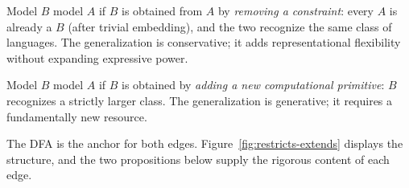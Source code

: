 \begin{defn}[Restricts]
\label{def:restricts}
Model $B$  model $A$ if $B$ is obtained from $A$ by \emph{removing a constraint}: every $A$ is already a $B$ (after trivial embedding), and the two recognize the same class of languages. The generalization is conservative; it adds representational flexibility without expanding expressive power.
\end{defn}

\begin{defn}
\label{def:extends-grammar}
Model $B$  model $A$ if $B$ is obtained by \emph{adding a new computational primitive}: $B$ recognizes a strictly larger class. The generalization is generative; it requires a fundamentally new resource.
\end{defn}

The DFA is the anchor for both edges. Figure~\ref{fig:restricts-extends} displays the structure, and the two propositions below supply the rigorous content of each edge.

